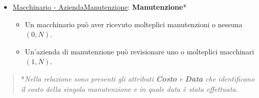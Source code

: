 \begin{itemize}
	\item \underline{Macchinario - AziendaManutenzione}: \textbf{Manutenzione}*
	
	\begin{itemize}
		\item Un macchinario può aver ricevuto molteplici manutenzioni o nessuna $(0,N)$.
		\item Un'azienda di manutenzione può revisionare uno o molteplici macchinari $(1,N)$.
	\end{itemize}
	
\end{itemize}

\begin{verse}
	*\emph{Nella relazione sono presenti gli attributi \textbf{Costo} e \textbf{Data} che identificano il costo della singola manutenzione e in quale data è stata effettuata.}
\end{verse}

